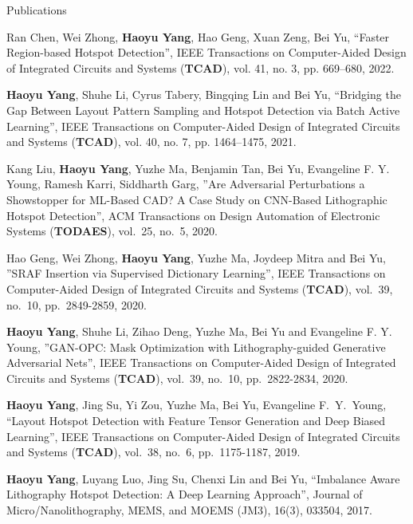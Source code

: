 \begin{rSection}{Publications}
\begin{description}[font=\normalfont]
\item[{[J8]}]{
	Ran Chen, Wei Zhong, \textbf{Haoyu Yang}, Hao Geng, Xuan Zeng, Bei Yu, ``Faster Region-based Hotspot Detection'',  
	IEEE Transactions on Computer-Aided Design of Integrated Circuits and Systems (\textbf{TCAD}), vol. 41, no. 3, pp. 669–680, 2022. 
}
	
\item[{[J7]}]{
	\textbf{Haoyu Yang}, Shuhe Li, Cyrus Tabery, Bingqing Lin and Bei Yu, ``Bridging the Gap Between Layout Pattern Sampling and Hotspot Detection via Batch Active Learning'', IEEE Transactions on Computer-Aided Design of Integrated Circuits and Systems (\textbf{TCAD}),  vol. 40, no. 7, pp. 1464–1475, 2021.
}	

\item[{[J6]}]{
	Kang Liu, \textbf{Haoyu Yang}, Yuzhe Ma, Benjamin Tan, Bei Yu, Evangeline F. Y. Young, Ramesh Karri, Siddharth Garg, ''Are Adversarial Perturbations a Showstopper for ML-Based CAD? A Case Study on CNN-Based Lithographic Hotspot Detection'', ACM Transactions on Design Automation of Electronic Systems (\textbf{TODAES}), vol.~25, no.~5, 2020.
}	
	
\item[{[J5]}]{
	Hao Geng, Wei Zhong, \textbf{Haoyu Yang}, Yuzhe Ma, Joydeep Mitra and Bei Yu, ''SRAF Insertion via Supervised Dictionary Learning'', IEEE Transactions on Computer-Aided Design of Integrated Circuits and Systems (\textbf{TCAD}), vol.~39, no.~10, pp.~2849-2859, 2020.
}	
	
\item[{[J4]}]{
	\textbf{Haoyu Yang}, Shuhe Li, Zihao Deng, Yuzhe Ma, Bei Yu and Evangeline F. Y. Young, ''GAN-OPC: Mask Optimization with Lithography-guided Generative Adversarial Nets'', IEEE Transactions on Computer-Aided Design of Integrated Circuits and Systems (\textbf{TCAD}), vol.~39, no.~10, pp.~2822-2834, 2020.
}

\item[{[J3]}]{
	\textbf{Haoyu Yang}, Jing Su, Yi Zou, Yuzhe Ma, Bei Yu, Evangeline F.~Y.~Young, ``Layout Hotspot Detection with Feature Tensor Generation and Deep Biased Learning'', IEEE Transactions on Computer-Aided Design of Integrated Circuits and Systems (\textbf{TCAD}), vol.~38, no.~6, pp.~1175-1187, 2019.
}
	
\item[{[J2]}]{
	\textbf{Haoyu Yang}, Luyang Luo, Jing Su, Chenxi Lin and Bei Yu, ``Imbalance Aware Lithography Hotspot Detection: A Deep Learning Approach'', Journal of Micro/Nanolithography, MEMS, and MOEMS (JM3), 16(3), 033504, 2017.
}


\end{description}
\end{rSection}
